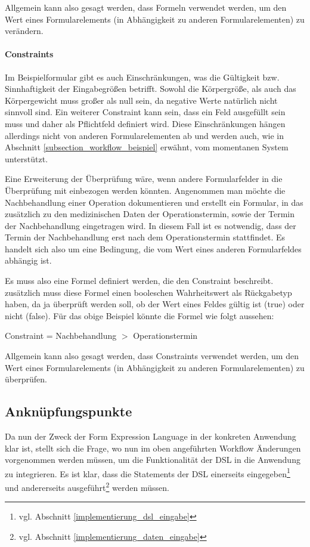 Allgemein kann also gesagt werden, dass Formeln verwendet werden, um den Wert eines Formularelements (in Abhängigkeit zu anderen Formularelementen) zu verändern.

\paragraph{Constraints}

Im Beispielformular gibt es auch Einschränkungen, was die Gültigkeit bzw. Sinnhaftigkeit der Eingabegrößen betrifft. Sowohl die Körpergröße, als auch das Körpergewicht muss großer als null sein, da negative Werte natürlich nicht sinnvoll sind. Ein weiterer Constraint kann sein, dass ein Feld ausgefüllt sein muss und daher als Pflichtfeld definiert wird. Diese Einschränkungen hängen allerdings nicht von anderen Formularelementen ab und werden auch, wie in Abschnitt \ref{subsection_workflow_beispiel} erwähnt, vom momentanen System unterstützt.

Eine Erweiterung der Überprüfung wäre, wenn andere Formularfelder in die Überprüfung mit einbezogen werden könnten. Angenommen man möchte die Nachbehandlung einer Operation dokumentieren und erstellt ein Formular, in das zusätzlich zu den medizinischen Daten der Operationstermin, sowie der Termin der Nachbehandlung eingetragen wird. In diesem Fall ist es notwendig, dass der Termin der Nachbehandlung erst nach dem Operationstermin stattfindet. Es handelt sich also um eine Bedingung, die vom Wert eines anderen Formularfeldes abhängig ist.

Es muss also eine Formel definiert werden, die den Constraint beschreibt. zusätzlich muss diese Formel einen booleschen Wahrheitswert als Rückgabetyp haben, da ja überprüft werden soll, ob der Wert eines Feldes gültig ist (true) oder nicht (false). Für das obige Beispiel könnte die Formel wie folgt aussehen:

\begin{center}
 Constraint = Nachbehandlung $ > $ Operationstermin
\end{center}

Allgemein kann also gesagt werden, dass Constraints verwendet werden, um den Wert eines Formularelements (in Abhängigkeit zu anderen Formularelementen) zu überprüfen.


\subsection{Anknüpfungspunkte}

Da nun der Zweck der Form Expression Language in der konkreten Anwendung klar ist, stellt sich die Frage, wo nun im oben angeführten Workflow Änderungen vorgenommen werden müssen, um die Funktionalität der DSL in die Anwendung zu integrieren. Es ist klar, dass die Statements der DSL einerseits eingegeben\footnote{vgl. Abschnitt \ref{implementierung_dsl_eingabe}  } und andererseits ausgeführt\footnote{vgl. Abschnitt \ref{implementierung_daten_eingabe} } werden müssen. 

